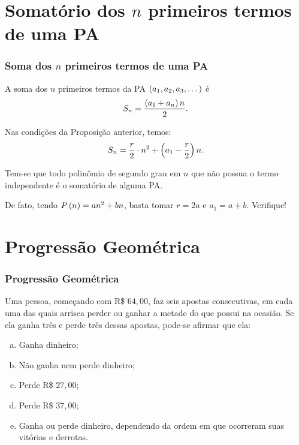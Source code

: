 \documentclass[brazil, notheorems, 10pt]{beamer}
\begin{document}

\section{Somatório dos $n$ primeiros termos de uma PA}
\begin{frame}
\frametitle{Soma dos $n$ primeiros termos de uma PA} %

\begin{Prop}
A soma dos $n$ primeiros termos da PA $\left(a_1, a_2 , a_3,
\dots\right)$ é $$S_n = \frac {\left(a_1 + a_n\right)n}{2}.$$
\end{Prop}\pause

\begin{Cor}
Nas condições da Proposição anterior, temos: $$S_n = \frac r 2 \cdot
n^2 + \left(a_1 - \frac r 2\right)n.$$
\end{Cor}

Tem-se que todo polinômio de segundo grau em $n$ que não possua o
termo independente é o somatório de alguma PA.

De fato, tendo $P \left(n\right) = an^2 + bn$, basta tomar $r = 2a$ e $a_1
= a+b$. Verifique!

\end{frame}
\section{Progressão Geométrica}
\begin{frame}
\frametitle{Progressão Geométrica} %


\begin{Exem}
Uma pessoa, começando com R\$ $64{,}00$, faz seis apostas
consecutivas, em cada uma das quais arrisca perder ou ganhar a
metade do que possui na ocasião. Se ela ganha três e perde três
dessas apostas, pode-se afirmar que ela:
\begin{enumerate}[a)]
	\item Ganha dinheiro;
	\item Não ganha nem perde dinheiro;
	\item Perde R\$ $27{,}00$;
	\item Perde R\$ $37{,}00$;
	\item Ganha ou perde dinheiro, dependendo da ordem em que
	ocorreram suas vitórias e derrotas.
\end{enumerate}
\end{Exem}
\end{frame}
\end{document}
